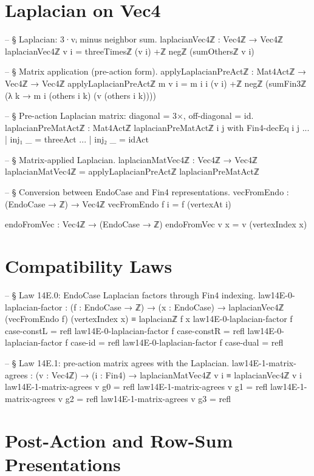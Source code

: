 \documentclass[11pt,a4paper]{book}
\begin{document}
\section{Laplacian on Vec4}

\begin{code}
-- § Laplacian: 3·vᵢ minus neighbor sum.
laplacianVec4ℤ : Vec4ℤ → Vec4ℤ
laplacianVec4ℤ v i = threeTimesℤ (v i) +ℤ negℤ (sumOthersℤ v i)

-- § Matrix application (pre-action form).
applyLaplacianPreActℤ : Mat4Actℤ → Vec4ℤ → Vec4ℤ
applyLaplacianPreActℤ m v i =
  m i i (v i) +ℤ
  negℤ (sumFin3ℤ (λ k → m i (others i k) (v (others i k))))

-- § Pre-action Laplacian matrix: diagonal = 3×, off-diagonal = id.
laplacianPreMatActℤ : Mat4Actℤ
laplacianPreMatActℤ i j with Fin4-decEq i j
... | inj₁ _ = threeAct
... | inj₂ _ = idAct

-- § Matrix-applied Laplacian.
laplacianMatVec4ℤ : Vec4ℤ → Vec4ℤ
laplacianMatVec4ℤ = applyLaplacianPreActℤ laplacianPreMatActℤ

-- § Conversion between EndoCase and Fin4 representations.
vecFromEndo : (EndoCase → ℤ) → Vec4ℤ
vecFromEndo f i = f (vertexAt i)

endoFromVec : Vec4ℤ → (EndoCase → ℤ)
endoFromVec v x = v (vertexIndex x)
\end{code}

\section{Compatibility Laws}

\begin{code}
-- § Law 14E.0: EndoCase Laplacian factors through Fin4 indexing.
law14E-0-laplacian-factor : (f : EndoCase → ℤ) → (x : EndoCase) →
  laplacianVec4ℤ (vecFromEndo f) (vertexIndex x) ≡ laplacianℤ f x
law14E-0-laplacian-factor f case-constL = refl
law14E-0-laplacian-factor f case-constR = refl
law14E-0-laplacian-factor f case-id = refl
law14E-0-laplacian-factor f case-dual = refl

-- § Law 14E.1: pre-action matrix agrees with the Laplacian.
law14E-1-matrix-agrees : (v : Vec4ℤ) → (i : Fin4) →
  laplacianMatVec4ℤ v i ≡ laplacianVec4ℤ v i
law14E-1-matrix-agrees v g0 = refl
law14E-1-matrix-agrees v g1 = refl
law14E-1-matrix-agrees v g2 = refl
law14E-1-matrix-agrees v g3 = refl
\end{code}

\section{Post-Action and Row-Sum Presentations}
\end{document}
